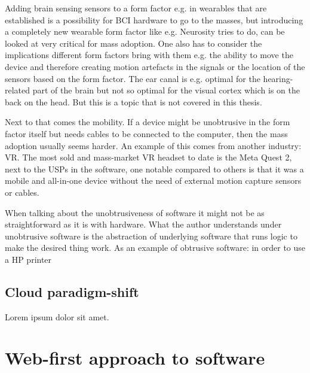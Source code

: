 Adding brain sensing sensors to a form factor e.g. in wearables that are established is a possibility for BCI hardware to go to the masses, but introducing a completely new wearable form factor like e.g. Neurosity tries to do, can be looked at very critical for mass adoption. One also has to consider the implications different form factors bring with them e.g. the ability to move the device and therefore creating motion artefacts in the signals or the location of the sensors based on the form factor. The ear canal is e.g. optimal for the hearing-related part of the brain but not so optimal for the visual cortex which is on the back on the head. But this is a topic that is not covered in this thesis.

Next to that comes the mobility. If a device might be unobtrusive in the form factor itself but needs cables to be connected to the computer, then the mass adoption usually seems harder. An example of this comes from another industry: VR. The most sold and mass-market VR headset to date is the Meta Quest 2, next to the USPs in the software, one notable compared to others is that it was a mobile and all-in-one device without the need of external motion capture sensors or cables.

When talking about the unobtrusiveness of software it might not be as straightforward as it is with hardware. What the author understands under unobtrusive software is the abstraction of underlying software that runs logic to make the desired thing work. As an example of obtrusive software: in order to use a HP printer

\subsection{Cloud paradigm-shift}
\label{chapter2-cloud-paradigm-shift}

Lorem ipsum dolor sit amet.



\section{Web-first approach to software}
\label{chapter2-web-first-approach-to-software}


